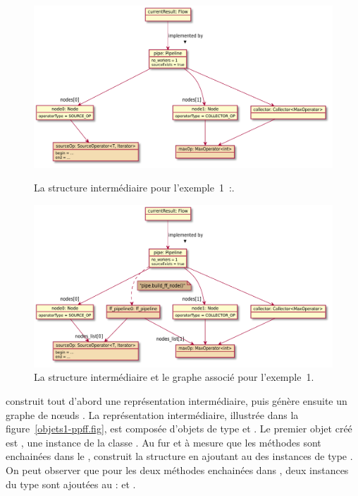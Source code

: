 \begin{figure}
\centering
         \includegraphics[width=1.0\textwidth]{Figures/objets1-ppff.pdf}
      \caption[La structure interm\'ediaire  pour l'exemple~1.]{La structure interm\'ediaire  pour
         l'exemple~1~:.}
       \label{objets1-ppff.fig}

\centering
         \includegraphics[width=1.0\textwidth]{Figures/objets1-ff.pdf}
      \caption{La structure interm\'ediaire  et le graphe  associé pour l'exemple~1.}
       \label{objets1-ff.fig}
\end{figure}

 construit tout d'abord une repr\'esentation interm\'ediaire, puis g\'en\`ere ensuite un graphe de n\oe{}uds . La repr\'esentation interm\'ediaire, illustr\'ee dans la figure~\ref{objets1-ppff.fig}, est compos\'ee d'objets de type  et . Le premier objet cr\'e\'e est , une instance de la classe . Au fur et \`a mesure que les m\'ethodes sont enchain\'ees dans le ,  construit la structure en ajoutant au  des instances de type . On peut observer que pour les deux m\'ethodes enchain\'ees dans , deux instances du type  sont ajout\'ees au  :  et . 

